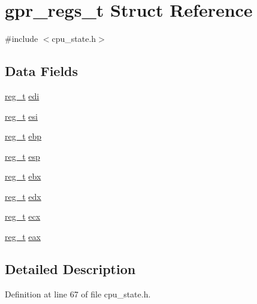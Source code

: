\hypertarget{structgpr__regs__t}{\section{gpr\-\_\-regs\-\_\-t \-Struct \-Reference}
\label{structgpr__regs__t}
}


{\ttfamily \#include $<$cpu\-\_\-state.\-h$>$}

\subsection*{\-Data \-Fields}
\begin{DoxyCompactItemize}
\item 
\hyperlink{types_8h_a089269ab3c13f602c75d4c7820175d67}{reg\-\_\-t} \hyperlink{structgpr__regs__t_a7598e52ec6dadbdf3816e40669fe09f5}{edi}
\item 
\hyperlink{types_8h_a089269ab3c13f602c75d4c7820175d67}{reg\-\_\-t} \hyperlink{structgpr__regs__t_a73a5061b1eb039e13ad92acdbf4f22f7}{esi}
\item 
\hyperlink{types_8h_a089269ab3c13f602c75d4c7820175d67}{reg\-\_\-t} \hyperlink{structgpr__regs__t_aac80e4ad6c812aef5f62cca8cc2d601a}{ebp}
\item 
\hyperlink{types_8h_a089269ab3c13f602c75d4c7820175d67}{reg\-\_\-t} \hyperlink{structgpr__regs__t_a607d89c914c7005254baa186f567d337}{esp}
\item 
\hyperlink{types_8h_a089269ab3c13f602c75d4c7820175d67}{reg\-\_\-t} \hyperlink{structgpr__regs__t_ab0eeaf724d891bb43e994a484f99ccc1}{ebx}
\item 
\hyperlink{types_8h_a089269ab3c13f602c75d4c7820175d67}{reg\-\_\-t} \hyperlink{structgpr__regs__t_a2df25d130fd9d71daead322610397811}{edx}
\item 
\hyperlink{types_8h_a089269ab3c13f602c75d4c7820175d67}{reg\-\_\-t} \hyperlink{structgpr__regs__t_aef035a70e62d22286938128fb55fb9d1}{ecx}
\item 
\hyperlink{types_8h_a089269ab3c13f602c75d4c7820175d67}{reg\-\_\-t} \hyperlink{structgpr__regs__t_af829d186724a11f28e98bfb592796bbc}{eax}
\end{DoxyCompactItemize}


\subsection{\-Detailed \-Description}


\-Definition at line 67 of file cpu\-\_\-state.\-h.



